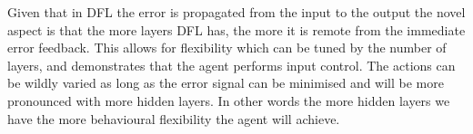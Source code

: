 \documentclass{llncs}
\begin{document}
Given that in DFL the error is propagated from the input to the output
the novel aspect is that the more layers DFL has, the more it is remote
from the immediate error feedback. This allows for flexibility which
can be tuned by the number of layers, and demonstrates that the agent
performs input control. The actions can be wildly varied as long as
the error signal can be minimised and will be more pronounced with
more hidden layers. In other words the more hidden layers we have the
more behavioural flexibility the agent will achieve.









\end{document}
